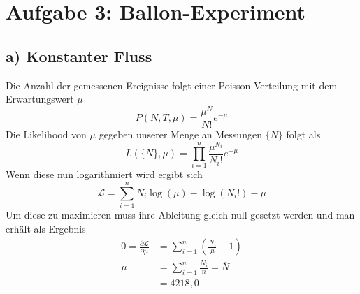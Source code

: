 \section*{Aufgabe 3: Ballon-Experiment}
\label{sec:Aufgabe3}
\subsection*{a) Konstanter Fluss}
Die Anzahl der gemessenen Ereignisse folgt einer Poisson-Verteilung mit dem Erwartungswert $\mu$
\begin{equation}
    P(N,T,\mu)=\frac{\mu^N}{N!}e^{-\mu}
\end{equation}
Die Likelihood von $\mu$ gegeben unserer Menge an Messungen $\{N\}$ folgt als
\begin{equation}
    L(\{N\},\mu)=\prod_{i=1}^n \frac{\mu^{N_i}}{N_i!}e^{-\mu}
\end{equation}
Wenn diese nun logarithmiert wird ergibt sich
\begin{equation}
    \mathcal{L}=\sum_{i=1}^n N_i\log(\mu)-\log(N_i!)-\mu
\end{equation}
Um diese zu maximieren muss ihre Ableitung gleich null gesetzt werden und man erhält als Ergebnis
\begin{align}
    0=\frac{\partial \mathcal{L}}{\partial \mu}&=
                \sum_{i=1}^n \left(\frac{N_i}{\mu}-1\right)\nonumber\\
    \mu&=\sum_{i=1}^n \frac{N_i}{n}=\overline{N}\nonumber\\
       &=4218,0
\end{align}


